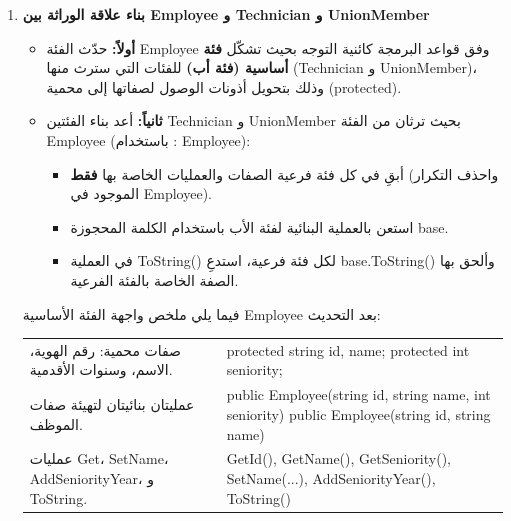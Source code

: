 \documentclass[14pt]{extarticle}
\begin{document}
\begin{enumerate}[resume, label=\textbf{تمرين \arabic*:}, wide=0pt, leftmargin=*, itemsep=2em]

    \item \textbf{بناء علاقة الوراثة بين \textenglish{Employee} و \textenglish{Technician} و \textenglish{UnionMember}}
    \begin{itemize}
        \item \textbf{أولاً:} حدّث الفئة \textenglish{Employee} وفق قواعد البرمجة كائنية التوجه بحيث تشكّل \textbf{فئة أساسية (فئة أب)} للفئات التي سترث منها (\textenglish{Technician} و \textenglish{UnionMember})، وذلك بتحويل أذونات الوصول لصفاتها إلى محمية (\textenglish{protected}).
        \item \textbf{ثانياً:} أعد بناء الفئتين \textenglish{Technician} و \textenglish{UnionMember} بحيث ترثان من الفئة \textenglish{Employee} (باستخدام \textenglish{: Employee}):
        \begin{itemize}
            \item أبقِ في كل فئة فرعية الصفات والعمليات الخاصة بها \textbf{فقط} (واحذف التكرار الموجود في \textenglish{Employee}).
            \item استعن بالعملية البنائية لفئة الأب باستخدام الكلمة المحجوزة \textenglish{base}.
            \item في العملية \textenglish{ToString()} لكل فئة فرعية، استدعِ \textenglish{base.ToString()} وألحق بها الصفة الخاصة بالفئة الفرعية.
        \end{itemize}
    \end{itemize}

    فيما يلي ملخص واجهة الفئة الأساسية \textenglish{Employee} بعد التحديث:

{\centering
\renewcommand{\arraystretch}{1.2}
\small
\begin{tabular}{|>{\raggedleft\arraybackslash}p{}|>{\raggedright\arraybackslash}p{}|}
\hline
\multicolumn{2}{|c|}{\textbf{الفئة الأساسية: \textenglish{Employee}}} \\
\hline
صفات محمية: رقم الهوية، الاسم، وسنوات الأقدمية. & \textenglish{protected string id, name;} \newline \textenglish{protected int seniority;} \\
\hline
عمليتان بنائيتان لتهيئة صفات الموظف. & \textenglish{public Employee(string id, string name, int seniority)} \newline \textenglish{public Employee(string id, string name)} \\
\hline
عمليات \textenglish{Get}، \textenglish{SetName}، \textenglish{AddSeniorityYear}، و \textenglish{ToString}. & \textenglish{GetId(), GetName(), GetSeniority(), SetName(...), AddSeniorityYear(), ToString()} \\
\hline
\end{tabular}
\par} %


\end{enumerate}
\end{document}

